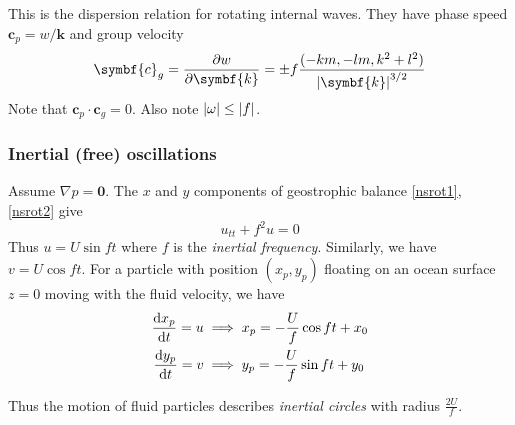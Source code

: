 \documentclass{jknotes}
\begin{document}
\begin{center}
\end{center}

This is the dispersion relation for rotating internal waves. They have phase
speed $\symbf{c}_p = w/\symbf{k}$ and group velocity 
\begin{equation}
	\symbf{c}_g = \frac{\partial w}{\partial \symbf{k}} = \pm f \frac{(-km, -lm, k^2
		+ l^2)}{\abs{\symbf{k}}^{3/2}}
\end{equation}
Note that $\symbf{c}_p\cdot\symbf{c}_g = 0$. Also note $\abs{\omega} \le \abs{f}$.

\subsubsection{Inertial (free) oscillations}
Assume $\nabla p = \symbf{0}$.  The $x$ and $y$ components of geostrophic balance
\eqref{nsrot1}, \eqref{nsrot2} give
\begin{equation}
	u_{tt} + f^2 u = 0
\end{equation}
Thus $u = U \sin ft$ where $f$ is the \emph{inertial frequency}. Similarly, we
have $v = U \cos ft$. For a particle with position $(x_p, y_p)$ floating on an
ocean surface $z=0$ moving with the fluid velocity, we have
\begin{equation}
	\begin{aligned}
		\frac{\diffd x_p}{\diffd t} = u &\implies x_p = -\frac{U}{f} \cos ft +
		x_0 \\
		\frac{\diffd y_p}{\diffd t} = v &\implies y_p = -\frac{U}{f} \sin ft +
		y_0
	\end{aligned}
\end{equation}

Thus the motion of fluid particles describes \emph{inertial circles}
with radius $\frac{2U}{f}$.
\end{document}
